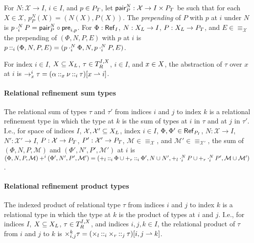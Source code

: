 For $N : \mathcal{X} \to I$, $i \in I$, and $p \in P_T$, let
$\mathsf{pair}_{P}^N : \mathcal{X} \to I \times P_T$ be such that
for each $X \in \mathcal{X}$, $p_{P}^N(X) = (N(X), P(X))$.
%
The \emph{prepending} of $P$ with $p$ at $i$ under $N$ is
$p \cdot_{i}^{N} P = \mathsf{pair}_{P}^{N} \circ
\mathsf{pre}_{i, p}$.
%
For $\Phi : \mathsf{Ref}_{ I }$, $N : X_L \to I$,
$P : X_L \to P_T$, and $E \in \equiv_{\mathcal{X}}$ the
prepending of $(\Phi, N, P, E)$ with $p$ at $i$ is
$p \mathbin{::}_{i} (\Phi, N, P, E) = (p \cdot_{i}^{N} \Phi, N, p
\cdot_{i}^{N} P, E)$.

For index $i \in I$, $X \subseteq X_L$,
$\tau \in T_{R}^{I, X}$, $i \in I$, and $x \in X$, the
abstraction of $\tau$ over $x$ at $i$ is
$\to_x^i \tau =  (\alpha \mathbin{::}_{x} \nu
  \mathbin{::}_{i} \tau)[ x \rightharpoonup i ]$.

\paragraph{Relational refinement sum types} The relational sum of
types $\tau$ and $\tau'$ from indices $i$ and $j$ to index $k$ is a
relational refinement type in which the type at $k$ is the sum of
types at $i$ in $\tau$ and at $j$ in $\tau'$.
%
I.e., for space of indices $I$,
$\mathcal{X}, \mathcal{X}' \subseteq X_L$, index $i \in I$,
$\Phi, \Phi' \in \mathsf{Ref}_{ P_{I} }$,
$N : \mathcal{X} \to I$, $N' : \mathcal{X}' \to I$,
$P : \mathcal{X} \to P_T$, $P' : \mathcal{X}' \to P_T$, 
$\mathcal{M} \in \equiv_{\mathcal{X}}$, and
$\mathcal{M}' \in \equiv_{\mathcal{X}'}$, the sum of
$(\Phi, N, P, \mathcal{M})$ and $(\Phi', N', P', \mathcal{M}')$ at $i$
is $(\Phi, N, P, \mathcal{M}) +^i (\Phi', N', P', \mathcal{M}') = %
(\tyleftsum \prepend{i} \Phi \union \tyrightsum \prepend{i} \Phi',
N \union N',
\tyleftsum \fullprepend{i}{N} P \union \tyrightsum \fullprepend{i}{N}
P',
\mathcal{M} \union \mathcal{M}')$.

\paragraph{Relational refinement product types}
The indexed product of relational type $\tau$ from indices $i$ and $j$
to index $k$ is a relational type in which the type at $k$ is the
product of types at $i$ and $j$.
%
I.e., for indices $I$, $X \subseteq X_L$,
$\tau \in T_{R}^{I, X}$, and indices $i, j, k \in I$, the
relational product of $\tau$ from $i$ and $j$ to $k$ is
$\times_{i, j}^k \tau =  (\times_l \mathbin{::}_{i} \times_r
  \mathbin{::}_{j} \tau)[  i, j  \rightharpoonup k ]$.

